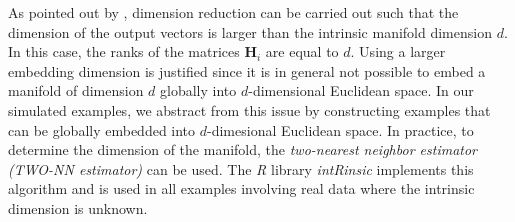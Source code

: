 \documentclass[11pt,a4paper,]{article}
\begin{document}
As pointed out by \textcite{Perrault-Joncas2013-pq}, dimension reduction can be carried out such that the dimension of the output vectors is larger than the intrinsic manifold dimension \(d\). In this case, the ranks of the matrices \(\pmb{H}_i\) are equal to \(d\). Using a larger embedding dimension is justified since it is in general not possible to embed a manifold of dimension \(d\) globally into \(d\)-dimensional Euclidean space. In our simulated examples, we abstract from this issue by constructing examples that can be globally embedded into \(d\)-dimesional Euclidean space. In practice, to determine the dimension of the manifold, the \emph{two-nearest neighbor estimator (TWO-NN estimator)} \autocite{Facco2017-rl,Denti2021-jl} can be used. The \emph{R} library \emph{intRinsic} \autocite{Denti2021-qc} implements this algorithm and is used in all examples involving real data where the intrinsic dimension is unknown.
\end{document}
